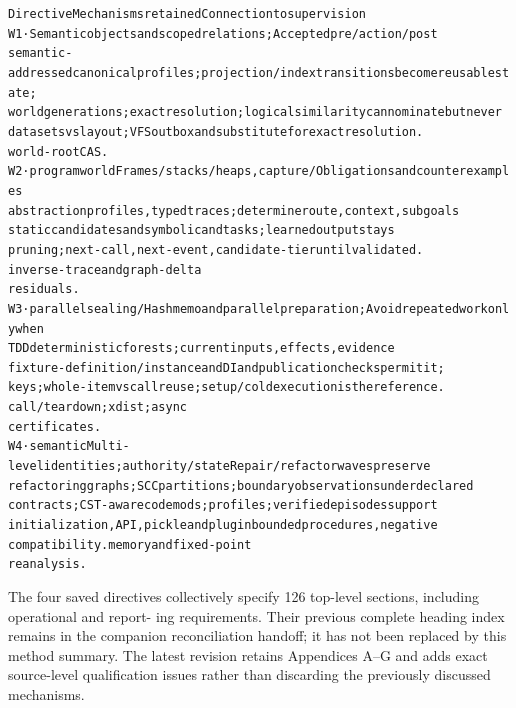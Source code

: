 \documentclass{article}
\begin{document}
\begingroup\fontsize{7}{8.4}\selectfont
\begin{alltt}
Directive                 Mechanisms retained                       Connection to supervision
W1 ·                      Semantic objects and scoped relations;    Accepted pre/action/post
semantic-addressed        canonical profiles; projection/index      transitions become reusable state;
world                     generations; exact resolution; logical    similarity can nominate but never
                          datasets vs layout; VFS outbox and        substitute for exact resolution.
                          world-root CAS.
W2 · program world        Frames/stacks/heaps, capture/             Obligations and counterexamples
                          abstraction profiles, typed traces;       determine route, context, subgoals
                          static candidates and symbolic            and tasks; learned output stays
                          pruning; next-call, next-event,           candidate-tier until validated.
                          inverse-trace and graph-delta
                          residuals.
W3 · parallel sealing /   Hash memo and parallel preparation;       Avoid repeated work only when
TDD                       deterministic forests;                    current inputs, effects, evidence
                          fixture-definition/instance and DI        and publication checks permit it;
                          keys; whole-item vs call reuse; setup/    cold execution is the reference.
                          call/teardown; xdist; async
                          certificates.
W4 · semantic             Multi-level identities; authority/state   Repair/refactor waves preserve
refactoring               graphs; SCC partitions; boundary          observations under declared
                          contracts; CST-aware codemods;            profiles; verified episodes support
                          initialization, API, pickle and plugin    bounded procedures, negative
                          compatibility.                            memory and fixed-point
                                                                    reanalysis.
\end{alltt}\endgroup


The four saved directives collectively specify 126 top-level sections, including operational and report-
ing requirements. Their previous complete heading index remains in the companion reconciliation
handoff; it has not been replaced by this method summary. The latest revision retains Appendices
A–G and adds exact source-level qualification issues rather than discarding the previously discussed
mechanisms.
\end{document}
